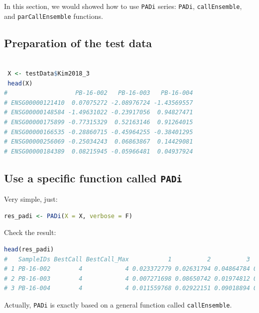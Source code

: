 \documentclass[
  12pt,
]{book}
\newcommand{\passthrough}[1]{#1}
\begin{document}
In this section, we would showed how to use \passthrough{\lstinline!PADi!} series: \passthrough{\lstinline!PADi!}, \passthrough{\lstinline!callEnsemble!}, and \passthrough{\lstinline!parCallEnsemble!} functions.

\hypertarget{preparation-of-the-test-data-1}{%
\subsection{Preparation of the test data}\label{preparation-of-the-test-data-1}}

\begin{lstlisting}[language=R]

 X <- testData$Kim2018_3
 head(X)
#                   PB-16-002   PB-16-003   PB-16-004
# ENSG00000121410  0.07075272 -2.08976724 -1.43569557
# ENSG00000148584 -1.49631022 -0.23917056  0.94827471
# ENSG00000175899 -0.77315329  0.52163146  0.91264015
# ENSG00000166535 -0.28860715 -0.45964255 -0.38401295
# ENSG00000256069 -0.25034243  0.06863867  0.14429081
# ENSG00000184389  0.08215945 -0.05966481  0.04937924
\end{lstlisting}

\hypertarget{use-a-specific-function-called-padi}{%
\subsection{\texorpdfstring{Use a specific function called \texttt{PADi}}{Use a specific function called PADi}}\label{use-a-specific-function-called-padi}}

Very simple, just:

\begin{lstlisting}[language=R]
res_padi <- PADi(X = X, verbose = F)
\end{lstlisting}

Check the result:

\begin{lstlisting}[language=R]
head(res_padi)
#   SampleIDs BestCall BestCall_Max           1          2          3         4
# 1 PB-16-002        4            4 0.023372779 0.02631794 0.04864784 0.3336484
# 2 PB-16-003        4            4 0.007271698 0.08650742 0.01974812 0.9530730
# 3 PB-16-004        4            4 0.011559768 0.02922151 0.09018894 0.8649045
\end{lstlisting}

Actually, \passthrough{\lstinline!PADi!} is exactly based on a general function called \passthrough{\lstinline!callEnsemble!}.
\end{document}
